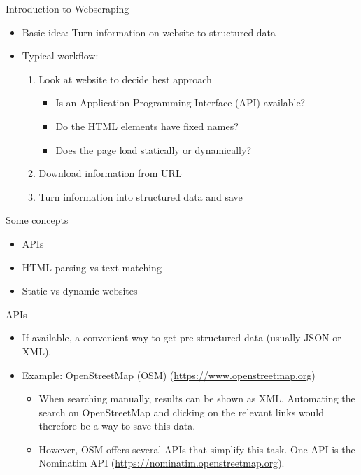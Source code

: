 \begin{frame}{Introduction to Webscraping}
\begin{itemize}
	\item Basic idea: Turn information on website to structured data
	\item Typical workflow:
	\begin{enumerate}
		\item Look at website to decide best approach
		\begin{itemize}
			\item Is an Application Programming Interface (API) available?
			\item Do the HTML elements have fixed names?
			\item Does the page load statically or dynamically?
		\end{itemize}
		\item Download information from URL
		\item Turn information into structured data and save
	\end{enumerate}
\end{itemize}
\end{frame}

\begin{frame}{Some concepts}
\begin{itemize}
	\item APIs
	\item HTML parsing vs text matching
	\item Static vs dynamic websites
\end{itemize}
\end{frame}

\begin{frame}{APIs}
\begin{itemize}
	\item If available, a convenient way to get pre-structured data (usually JSON or XML).
	\item Example: OpenStreetMap (OSM) (\url{https://www.openstreetmap.org})
	\begin{itemize}
		\item When searching manually, results can be shown as XML. Automating the search on OpenStreetMap and clicking on the relevant links would therefore be a way to save this data.
		\item However, OSM offers several APIs that simplify this task. One API is the Nominatim API (\url{https://nominatim.openstreetmap.org}).
	\end{itemize}
\end{itemize}
\end{frame}

